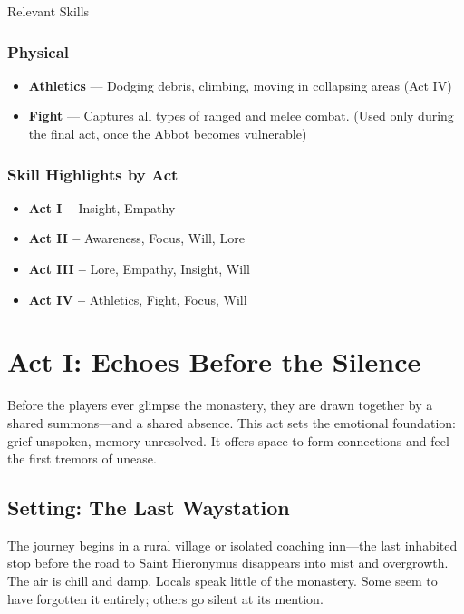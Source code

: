 \begin{CommentBox}{Relevant Skills}
    \subsubsection*{Physical}
    \begin{itemize}
        \item \textbf{Athletics} — Dodging debris, climbing, moving in collapsing areas (Act IV)
        \item \textbf{Fight} — Captures all types of ranged and melee combat. (Used only during the final act, once the Abbot becomes vulnerable)
    \end{itemize}
    
    \subsubsection*{Skill Highlights by Act}
    \begin{itemize}
        \item \textbf{Act I –} Insight, Empathy
        \item \textbf{Act II –} Awareness, Focus, Will, Lore
        \item \textbf{Act III –} Lore, Empathy, Insight, Will
        \item \textbf{Act IV –} Athletics, Fight, Focus, Will
    \end{itemize}    
\end{CommentBox}

\newcolumn
    
\section{Act I: Echoes Before the Silence}

Before the players ever glimpse the monastery, they are drawn together by a shared summons—and a shared absence. This act sets the emotional foundation: grief unspoken, memory unresolved. It offers space to form connections and feel the first tremors of unease.

\subsection*{Setting: The Last Waystation}

The journey begins in a rural village or isolated coaching inn—the last inhabited stop before the road to Saint Hieronymus disappears into mist and overgrowth. The air is chill and damp. Locals speak little of the monastery. Some seem to have forgotten it entirely; others go silent at its mention.

